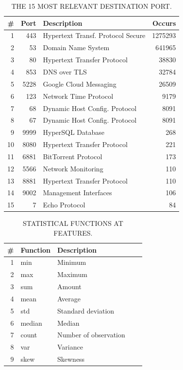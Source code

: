 \begin{table}[h]
  \caption{THE 15 MOST RELEVANT DESTINATION PORT.}
  \centering
  \begin{small}
    \begin{tabular}{rrlr}   \hline
 \# & Port & Description & Occurs  \\ \hline

1 &  443 &  Hypertext Transf. Protocol Secure &  1275293  \\ 
  2 &  53 & Domain Name System & 641965  \\ 
  3 &  80 & Hypertext Transfer Protocol &  38830  \\ 
  4 &  853 & DNS over TLS &  32784  \\ 
  5 &  5228 & Google Cloud Messaging &  26509  \\ 
  6 &  123 & Network Time Protocol & 9179  \\ 
  7 &  68 & Dynamic Host Config. Protocol &  8091  \\ 
  8 &  67 & Dynamic Host Config. Protocol &  8091  \\ 
  9 &  9999 & HyperSQL Database &  268  \\ 
  10 & 8080 & Hypertext Transfer Protocol & 221  \\ 
  11 & 6881 & BitTorrent Protocol & 173  \\ 
  12 & 5566 & Network Monitoring & 110  \\ 
  13 & 8881 & Hypertext Transfer Protocol & 110  \\ 
  14 & 9002 & Management Interfaces & 106  \\ 
  15 & 7 & Echo Protocol & 84  \\ 
   \hline

 \end{tabular}
 \end{small}
 \label{tab:port}
 \end{table}


\begin{table}[ht]
  \caption{STATISTICAL FUNCTIONS AT FEATURES.}
  \centering
  \begin{small}
    \begin{tabular}{rllrr}   \hline
 \# & Function & Description\\ \hline

1 &  min &  Minimum\\ 
  2 &  max & Maximum\\ 
  3 &  sum & Amount\\ 
  4 &  mean & Average\\ 
  5 &  std & Standard deviation \\ 
  6 &  median & Median\\ 
  7 &  count & Number of observation\\ 
  8 &  var & Variance\\ 
  9 &  skew & Skewness \\ 
   \hline

 \end{tabular}
 \end{small}
 \label{tab:function}
 \end{table}

